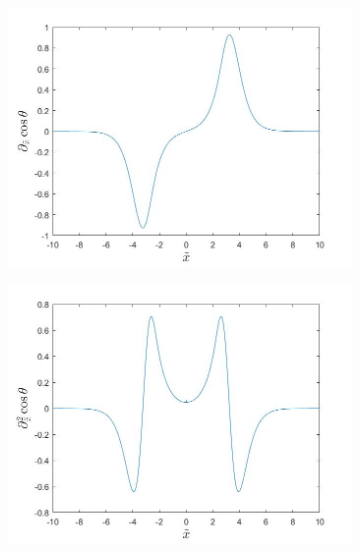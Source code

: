 \begin{figure}[h!]
\centering
\begin{subfigure}{.45\textwidth}
  \centering
  \includegraphics[width=\linewidth]{Figures/dCosTheta.jpg}
  \caption{}
\end{subfigure}
\begin{subfigure}{.45\textwidth}
  \centering
  \includegraphics[width=\linewidth]{Figures/d2CosTheta.jpg}
  \caption{}
\end{subfigure}


\end{figure}
